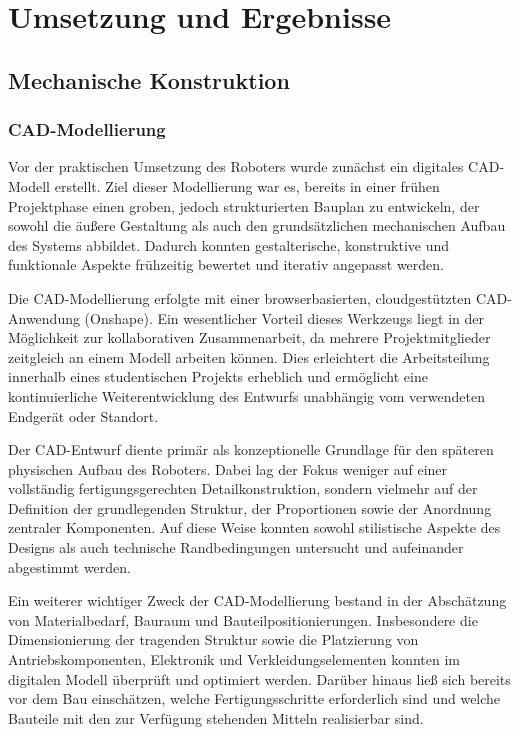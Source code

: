 \chapter{Umsetzung und Ergebnisse}
\label{cha:Umsetzung und Ergebnisse}

\section{Mechanische Konstruktion}
\label{cha:Mechanische Konstruktion}

\subsection{CAD-Modellierung}
\label{cha:CAD-Modellierung}

Vor der praktischen Umsetzung des Roboters wurde zunächst ein digitales CAD-Modell erstellt. Ziel dieser Modellierung war es, bereits in einer frühen Projektphase einen groben, jedoch strukturierten Bauplan zu entwickeln, der sowohl die äußere Gestaltung als auch den grundsätzlichen mechanischen Aufbau des Systems abbildet. Dadurch konnten gestalterische, konstruktive und funktionale Aspekte frühzeitig bewertet und iterativ angepasst werden.

Die CAD-Modellierung erfolgte mit einer browserbasierten, cloudgestützten CAD-Anwendung (Onshape\reg). Ein wesentlicher Vorteil dieses Werkzeugs liegt in der Möglichkeit zur kollaborativen Zusammenarbeit, da mehrere Projektmitglieder zeitgleich an einem Modell arbeiten können. Dies erleichtert die Arbeitsteilung innerhalb eines studentischen Projekts erheblich und ermöglicht eine kontinuierliche Weiterentwicklung des Entwurfs unabhängig vom verwendeten Endgerät oder Standort.

Der CAD-Entwurf diente primär als konzeptionelle Grundlage für den späteren physischen Aufbau des Roboters. Dabei lag der Fokus weniger auf einer vollständig fertigungsgerechten Detailkonstruktion, sondern vielmehr auf der Definition der grundlegenden Struktur, der Proportionen sowie der Anordnung zentraler Komponenten. Auf diese Weise konnten sowohl stilistische Aspekte des Designs als auch technische Randbedingungen untersucht und aufeinander abgestimmt werden.

Ein weiterer wichtiger Zweck der CAD-Modellierung bestand in der Abschätzung von Materialbedarf, Bauraum und Bauteilpositionierungen. Insbesondere die Dimensionierung der tragenden Struktur sowie die Platzierung von Antriebskomponenten, Elektronik und Verkleidungselementen konnten im digitalen Modell überprüft und optimiert werden. Darüber hinaus ließ sich bereits vor dem Bau einschätzen, welche Fertigungsschritte erforderlich sind und welche Bauteile mit den zur Verfügung stehenden Mitteln realisierbar sind.

